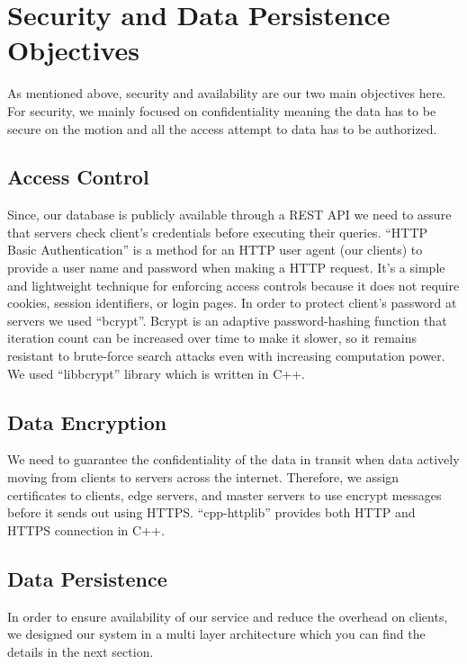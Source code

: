 \section{Security and Data Persistence Objectives}
\label{sec:Solution}
As mentioned above, security and availability are our two main objectives here. For security, we mainly focused on confidentiality meaning the data has to be secure on the motion and all the access attempt to data has to be authorized.
\subsection{Access Control}
Since, our database is publicly available through a REST API we need to assure that servers check client's credentials before executing their queries. ``HTTP Basic Authentication'' is a method for an HTTP user agent (our clients) to provide a user name and password when making a HTTP request. It's a simple and lightweight technique for enforcing access controls because it does not require cookies, session identifiers, or login pages. In order to protect client's password at servers we used ``bcrypt''. Bcrypt is an adaptive password-hashing function that iteration count can be increased over time to make it slower, so it remains resistant to brute-force search attacks even with increasing computation power. We used ``libbcrypt'' library \cite{libbcrypt} which is written in C++. 

\subsection{Data Encryption}
We need to guarantee the confidentiality of the data in transit when data actively moving from clients to servers across the internet. Therefore, we assign certificates to clients, edge servers, and master servers to use encrypt messages before it sends out using HTTPS. ``cpp-httplib'' \cite{httplib} provides both HTTP and HTTPS connection in C++.

\subsection{Data Persistence}
In order to ensure availability of our service and reduce the overhead on clients, we designed our system in a multi layer architecture which you can find the details in the next section. 
